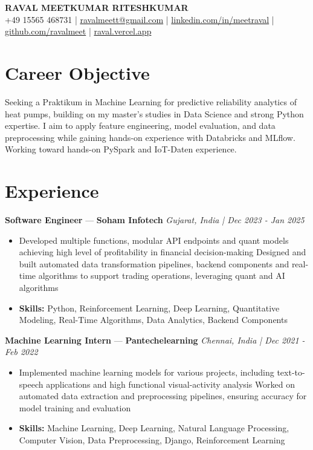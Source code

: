\documentclass[a4paper,10pt]{article}
\begin{document}
\begin{center}
  {\Large\bfseries RAVAL MEETKUMAR RITESHKUMAR}\\[2pt]
  {\small +49 15565 468731 \;|\; \href{mailto:ravalmeett@gmail.com}{ravalmeett@gmail.com} \;|\; \href{https://www.linkedin.com/in/meetraval/}{linkedin.com/in/meetraval} \;|\; \href{https://github.com/ravalmeet}{github.com/ravalmeet} \;|\; \href{https://raval.vercel.app/}{raval.vercel.app}}
\end{center}
\vspace{-3pt}

\section*{Career Objective}
Seeking a Praktikum in Machine Learning for predictive reliability analytics of heat pumps, building on my master's studies in Data Science and strong Python expertise. I aim to apply feature engineering, model evaluation, and data preprocessing while gaining hands-on experience with Databricks and MLflow. Working toward hands-on PySpark and IoT-Daten experience.\par

\section*{Experience}
\textbf{Software Engineer} — \textbf{Soham Infotech} \hfill \textit{Gujarat, India \;|\; Dec 2023 - Jan 2025}\par
\vspace{1pt}
\begin{itemize}
  \item Developed multiple functions, modular API endpoints and quant models achieving high level of profitability in financial decision-making Designed and built automated data transformation pipelines, backend components and real-time algorithms to support trading operations, leveraging quant and AI algorithms
  \item \textbf{Skills:} Python, Reinforcement Learning, Deep Learning, Quantitative Modeling, Real-Time Algorithms, Data Analytics, Backend Components
\end{itemize}
\vspace{3pt}
\textbf{Machine Learning Intern} — \textbf{Pantechelearning} \hfill \textit{Chennai, India \;|\; Dec 2021 - Feb 2022}\par
\vspace{1pt}
\begin{itemize}
  \item Implemented machine learning models for various projects, including text-to-speech applications and high functional visual-activity analysis Worked on automated data extraction and preprocessing pipelines, ensuring accuracy for model training and evaluation
  \item \textbf{Skills:} Machine Learning, Deep Learning, Natural Language Processing, Computer Vision, Data Preprocessing, Django, Reinforcement Learning
\end{itemize}
\end{document}
